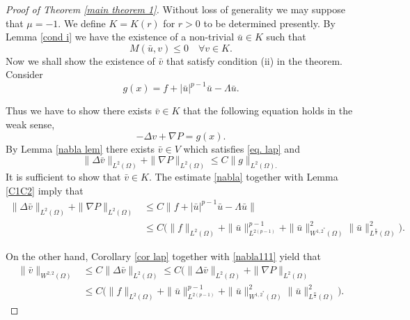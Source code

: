 \documentclass[10pt,a4paper]{amsart}
\numberwithin{equation}{section}
\begin{document}
\begin{proof}[Proof of Theorem \ref{main theorem 1}]
 Without loss of generality we may suppose that \(\mu=-1\).
We define \(K = K({r})\) for $r>0$ to be determined presently.
By Lemma \ref{cond i} we have the existence of a non-trivial \(\bar{u} \in K\)
such that
\[
M(\bar{u}, v)\leq 0\quad  \forall v\in  K.
\]
Now we shall show the existence of \(\bar{v}\) that satisfy condition (ii) in the
theorem. Consider
\[
g(x)=f+|\bar{u}|^{p-1}\bar{u}-\Lambda \bar{u}.
\]

Thus we have to show there exists \(\bar{v}\in K\)  that the following equation holds
in the weak sense,
\begin{equation}\label{eq. lap}
   -\Delta v + \nabla P=g(x).
\end{equation}
By Lemma \ref{nabla lem} there exists \(\bar{v}\in V \)
which satisfies \eqref{eq. lap} and
\begin{equation}\label{nabla}
\rVert \Delta \bar{v} \rVert_{L^2(\Omega)}
+\rVert \nabla P \rVert_{L^2(\Omega)}\leq C\rVert g \rVert_{L^2(\Omega).}
\end{equation}
It is sufficient to show that \( \bar{v}\in K\). The  estimate \eqref{nabla}
together with  Lemma \ref{C1C2} imply that
\begin{equation} \label{nabla111}
\begin{aligned}
   \rVert \Delta {\bar{v}} \rVert_{L^2(\Omega)}
   +\rVert \nabla P \rVert_{L^2(\Omega)}
   &\leq C \rVert f+|\bar{u}|^{p-1}\bar{u}-\Lambda \bar{u}\rVert \\
   &\leq C\big( \rVert f\rVert_{L^2(\Omega)}+\rVert \bar{u}\rVert^{p-1}_{L^{2(p-1)}}
   +\rVert \bar{u}\rVert^{2}_{W^{1,2^*}(\Omega)} \rVert
    \bar{u}\rVert^2_{L^{\frac{n}{2}}(\Omega)} \big) .
\end{aligned}
\end{equation}

On the other hand, Corollary \ref{cor lap} together with \eqref{nabla111} yield that
\begin{equation}\label{CC}
\begin{aligned}
    \rVert \bar{v} \rVert_{ W^{2,2}(\Omega)}
     &\leq C \rVert \Delta \bar{v} \rVert_{ L^2(\Omega)}
     \leq {C}\big(\rVert \Delta \bar{v} \rVert_{L^2(\Omega)}
    +\rVert \nabla P \rVert_{L^2(\Omega)} \\
     &\leq C\big( \rVert f\rVert_{L^2(\Omega)}
    +\rVert \bar{u}\rVert^{p-1}_{L^{2(p-1)}}
    +\rVert \bar{u}\rVert^{2}_{W^{1,2^*}(\Omega)} \rVert
    \bar{u}\rVert^2_{L^{\frac{n}{2}}(\Omega)} \big).
\end{aligned}
\end{equation}



\end{proof}
\end{document}
